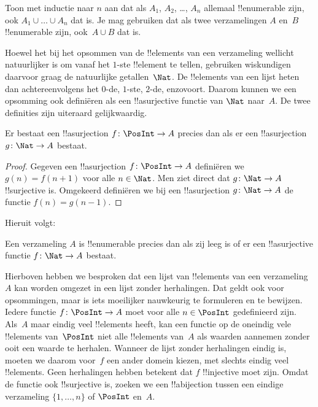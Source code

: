 \documentclass[openany]{memoir}
\begin{document}
\begin{prob}
  Toon met inductie naar $n$ aan dat als $A_1$, $A_2$, \dots, $A_n$
  allemaal !!{enumerable} zijn, ook $A_1 \cup \dots \cup A_n$ dat is.
  Je mag gebruiken dat als twee verzamelingen $A$ en~$B$ !!{enumerable}
  zijn, ook~$A \cup B$ dat is. 
\end{prob}

Hoewel het bij het opsommen van de !!{element}s van een verzameling
wellicht natuurlijker is om vanaf het $1$-ste !!{element} te tellen,
gebruiken wiskundigen daarvoor graag de natuurlijke getallen~$\Nat$.
De !!{element}s van een lijst heten dan achtereenvolgens het $0$-de,
$1$-ste, $2$-de, enzovoort. Daarom kunnen we een
opsomming ook definiëren als een !!a{surjective} functie van $\Nat$
naar~$A$. De twee definities zijn uiteraard gelijkwaardig.

\begin{prop}
  Er bestaat een !!a{surjection} $f\colon \PosInt \to A$ precies dan
  als er een !!a{surjection} $g\colon \Nat \to A$ bestaat.
\end{prop}

\begin{proof}
  Gegeven een !!a{surjection} $f\colon \PosInt \to A$ definiëren we
  $g(n) = f(n+1)$ voor alle $n \in \Nat$. Men ziet direct dat
  $g\colon \Nat \to A$ !!{surjective} is. Omgekeerd definiëren we bij
  een !!a{surjection} $g\colon \Nat \to A$ de functie
  $f(n) = g(n-1)$.
\end{proof}

Hieruit volgt:

\begin{cor}
Een verzameling $A$ is !!{enumerable} precies dan als zij leeg is of er
een !!a{surjective} functie $f\colon \Nat \to A$ bestaat.
\end{cor}

Hierboven hebben we besproken dat een lijst van !!{element}s van een
verzameling~$A$ kan worden omgezet in een lijst zonder herhalingen. Dat
geldt ook voor opsommingen, maar is iets moeilijker nauwkeurig te
formuleren en te bewijzen. Iedere functie $f\colon \PosInt \to A$ moet
voor alle $n \in \PosInt$ gedefinieerd zijn. Als~$A$ maar eindig veel
!!{element}s heeft, kan een functie op de oneindig vele !!{element}s
van~$\PosInt$ niet alle !!{element}s van~$A$ als waarden aannemen zonder
ooit een waarde te herhalen. Wanneer de lijst zonder herhalingen eindig
is, moeten we daarom voor~$f$ een ander domein kiezen, met slechts eindig
veel !!{element}s. Geen herhalingen hebben betekent dat $f$
!!{injective} moet zijn. Omdat de functie ook !!{surjective} is, zoeken
we een !!a{bijection} tussen een eindige verzameling $\{1, \dots, n\}$
of $\PosInt$ en~$A$.
\end{document}

